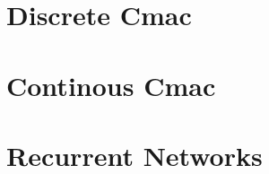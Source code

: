 \documentclass{article}
\begin{document}
\section{Discrete Cmac}
\section{Continous Cmac}
\section{Recurrent Networks}
\end{document}
